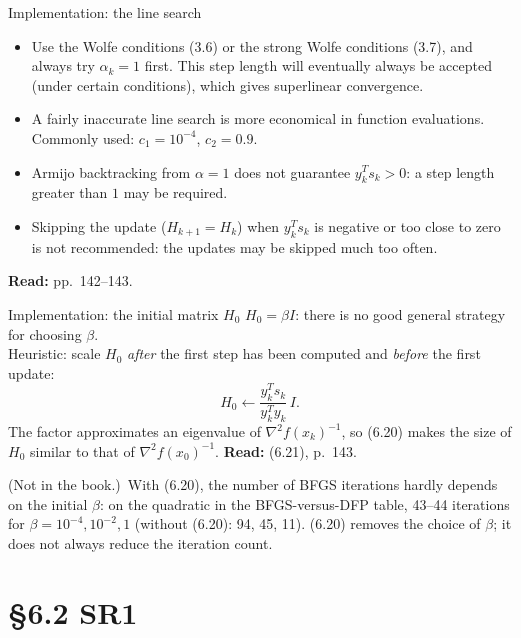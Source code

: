 \documentclass[aspectratio=169,12pt]{beamer}
\newcommand{\hessf}{\nabla^{2} f}
\newcommand{\la}{\leftarrow}
\newcommand{\readbook}[1]{{\color{red}\textbf{Read:} #1}}
\newcommand{\notinbook}{{\small(Not in the book.)}}
\begin{document}
\begin{frame}{Implementation: the line search}
  \begin{itemize}\setlength\itemsep{0.7em}
    \item Use the Wolfe conditions (3.6) or the strong Wolfe conditions (3.7), and
      \alert{always try $\alpha_{k}=1$ first}. This step length will eventually always be accepted
      (under certain conditions), which gives superlinear convergence.
    \item A fairly inaccurate line search is more economical in function evaluations.
      Commonly used: $c_{1}=10^{-4}$, $c_{2}=0.9$.
    \item Armijo backtracking from $\alpha=1$ does not guarantee $y_{k}^{T}s_{k}>0$: a step length
      greater than $1$ may be required.
    \item Skipping the update ($H_{k+1}=H_{k}$) when $y_{k}^{T}s_{k}$ is negative or too close to zero
      is \alert{not recommended}: the updates may be skipped much too often.
  \end{itemize}

  \vspace{0.5em}
  \readbook{pp.~142--143.}
\end{frame}

\begin{frame}{Implementation: the initial matrix $H_{0}$}
  $H_{0}=\beta I$: there is no good general strategy for choosing $\beta$.\\[0.3em]
  Heuristic: scale $H_{0}$ \emph{after} the first step has been computed and \emph{before} the
  first update:
  \[ H_{0}\la\frac{y_{k}^{T}s_{k}}{y_{k}^{T}y_{k}}\,I . \tag{6.20} \]
  The factor approximates an eigenvalue of $\hessf(x_{k})^{-1}$, so (6.20) makes the size of $H_{0}$
  similar to that of $\hessf(x_{0})^{-1}$. \readbook{(6.21), p.~143.}

  \vspace{0.6em}
  \notinbook\ With (6.20), the number of BFGS iterations hardly depends on the initial $\beta$:
  on the quadratic in the BFGS-versus-DFP table, 43--44 iterations for $\beta=10^{-4},10^{-2},1$
  (without (6.20): 94, 45, 11). (6.20) removes the choice of $\beta$; it does not always reduce the
  iteration count.
\end{frame}

\section{\S6.2 SR1}
\end{document}
